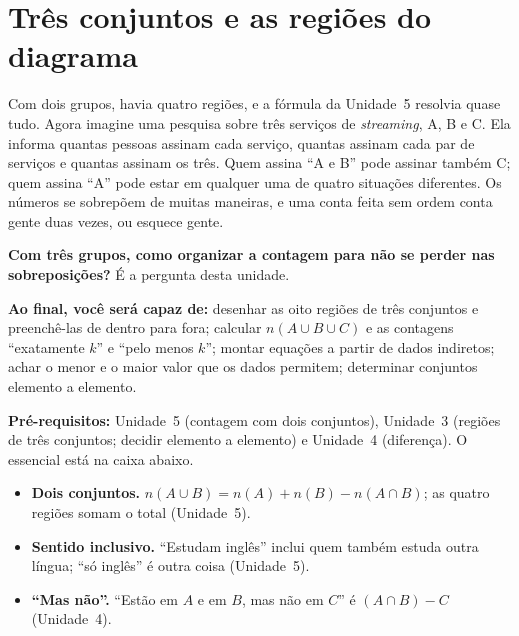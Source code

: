 \clearpage
\section{Três conjuntos e as regiões do diagrama}

\Prefacio
\begin{prefacio}

Com dois grupos, havia quatro regiões, e a fórmula da Unidade~5 resolvia quase tudo. Agora imagine uma pesquisa sobre três serviços de \emph{streaming}, A, B e C. Ela informa quantas pessoas assinam cada serviço, quantas assinam cada par de serviços e quantas assinam os três. Quem assina \enquote{A e B} pode assinar também C; quem assina \enquote{A} pode estar em qualquer uma de quatro situações diferentes. Os números se sobrepõem de muitas maneiras, e uma conta feita sem ordem conta gente duas vezes, ou esquece gente.

{\raggedright\textbf{Com três grupos, como organizar a contagem para não se perder nas sobreposições?} É a pergunta desta unidade.\par}

\textbf{Ao final, você será capaz de:} desenhar as oito regiões de três conjuntos e preenchê-las de dentro para fora; calcular $n(A\cup B\cup C)$ e as contagens \enquote{exatamente $k$} e \enquote{pelo menos $k$}; montar equações a partir de dados indiretos; achar o menor e o maior valor que os dados permitem; determinar conjuntos elemento a elemento.

\textbf{Pré-requisitos:} Unidade~5 (contagem com dois conjuntos), Unidade~3 (regiões de três conjuntos; decidir elemento a elemento) e Unidade~4 (diferença). O essencial está na caixa abaixo.
\end{prefacio}

\begin{minimo}
\begin{itemize}[leftmargin=1.4em,itemsep=1pt]
  \item \textbf{Dois conjuntos.} $n(A\cup B)=n(A)+n(B)-n(A\cap B)$; as quatro regiões somam o total (Unidade~5).
  \item \textbf{Sentido inclusivo.} \enquote{Estudam inglês} inclui quem também estuda outra língua; \enquote{só inglês} é outra coisa (Unidade~5).
  \item \textbf{\enquote{Mas não}.} \enquote{Estão em $A$ e em $B$, mas não em $C$} é $(A\cap B)-C$ (Unidade~4).
\end{itemize}
\end{minimo}

